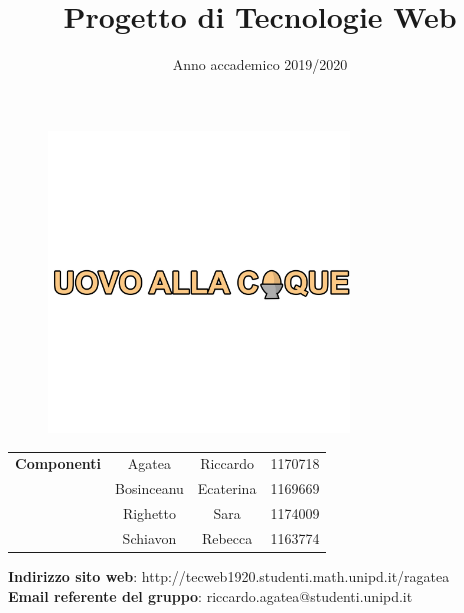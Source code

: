 
\title{Progetto di Tecnologie Web}
\author{}
\date{Anno accademico 2019/2020}


\maketitle
\begin{figure}[H]
	\centering
	\includegraphics[width=8cm]{img/logo/coque_scritta.png}
\end{figure}
\begin{table}[H]
	\centering
	\begin{tabular}{c|c c c}
		\textbf{Componenti} & Agatea     & Riccardo  & 1170718 \\
		                    & Bosinceanu & Ecaterina & 1169669 \\
		                    & Righetto   & Sara      & 1174009 \\
		                    & Schiavon   & Rebecca   & 1163774 \\
	\end{tabular}
\end{table}

\begin{center}
	\textbf{Indirizzo sito web}: http://tecweb1920.studenti.math.unipd.it/ragatea\\
	\textbf{Email referente del gruppo}: riccardo.agatea@studenti.unipd.it
\end{center}

